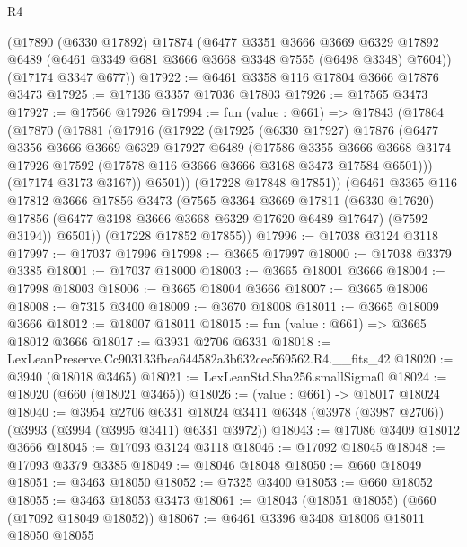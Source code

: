\begin{lexlean}{R4}
\begin{coremodule}
    (@17890
      (@6330 @17892)
      @17874
      (@6477
        @3351
        @3666
        @3669
        @6329
        @17892
        @6489
        (@6461 @3349 @681 @3666 @3668 @3348 @7555 (@6498 @3348) @7604))
      (@17174 @3347 @677))
@17922 := @6461 @3358 @116 @17804 @3666 @17876 @3473
@17925 := @17136 @3357 @17036 @17803
@17926 := @17565 @3473
@17927 := @17566 @17926
@17994 := fun (value : @661) =>
  @17843
    (@17864
      (@17870
        (@17881
          (@17916
            (@17922
              (@17925
                (@6330 @17927)
                @17876
                (@6477
                  @3356
                  @3666
                  @3669
                  @6329
                  @17927
                  @6489
                  (@17586
                    @3355
                    @3666
                    @3668
                    @3174
                    @17926
                    @17592
                    (@17578 @116 @3666 @3666 @3168 @3473 @17584 @6501)))
                (@17174 @3173 @3167))
              @6501))
          (@17228 @17848 @17851))
        (@6461
          @3365
          @116
          @17812
          @3666
          @17856
          @3473
          (@7565
            @3364
            @3669
            @17811
            (@6330 @17620)
            @17856
            (@6477 @3198 @3666 @3668 @6329 @17620 @6489 @17647)
            (@7592 @3194))
          @6501))
      (@17228 @17852 @17855))
@17996 := @17038 @3124 @3118
@17997 := @17037 @17996
@17998 := @3665 @17997
@18000 := @17038 @3379 @3385
@18001 := @17037 @18000
@18003 := @3665 @18001 @3666
@18004 := @17998 @18003
@18006 := @3665 @18004 @3666
@18007 := @3665 @18006
@18008 := @7315 @3400
@18009 := @3670 @18008
@18011 := @3665 @18009 @3666
@18012 := @18007 @18011
@18015 := fun (value : @661) => @3665 @18012 @3666
@18017 := @3931 @2706 @6331
@18018 := LexLeanPreserve.Cc903133fbea644582a3b632cec569562.R4.__fits_42
@18020 := @3940 (@18018 @3465)
@18021 := LexLeanStd.Sha256.smallSigma0
@18024 := @18020 (@660 (@18021 @3465))
@18026 := (value : @661) -> @18017 @18024
@18040 := @3954
    @2706
    @6331
    @18024
    @3411
    @6348
    (@3978 (@3987 @2706))
    (@3993 (@3994 (@3995 @3411) @6331 @3972))
@18043 := @17086 @3409 @18012 @3666
@18045 := @17093 @3124 @3118
@18046 := @17092 @18045
@18048 := @17093 @3379 @3385
@18049 := @18046 @18048
@18050 := @660 @18049
@18051 := @3463 @18050
@18052 := @7325 @3400
@18053 := @660 @18052
@18055 := @3463 @18053 @3473
@18061 := @18043 (@18051 @18055) (@660 (@17092 @18049 @18052))
@18067 := @6461 @3396 @3408 @18006 @18011 @18050 @18055

\end{coremodule}
\end{lexlean}
